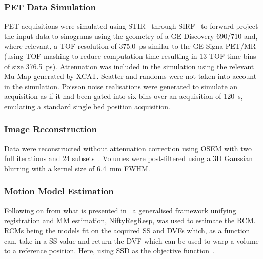             \subsubsection{PET Data Simulation} \label{sec:impact_of_tof_on_respiratory_motion_model_estimation_using_pre_gated_no_intra_cycle_motion_nac_pet_methods_pet_data_simulation}
                \gls{PET} acquisitions were simulated using \gls{STIR}~\parencite{Thielemans2012} through \gls{SIRF}~\parencite{Ovtchinnikov2017} to forward project the input data to sinograms using the geometry of a \gls{GE} Discovery 690/710 and, where relevant, a \gls{TOF} resolution of \SI{375.0}{\pico\second} similar to the \gls{GE} Signa \gls{PET}/\gls{MR} (using \gls{TOF} mashing to reduce computation time resulting in $13$ \gls{TOF} time bins of size \SI{376.5}{\pico\second}). Attenuation was included in the simulation using the relevant \gls{Mu-Map} generated by \gls{XCAT}. Scatter and randoms were not taken into account in the simulation. Poisson noise realisations were generated to simulate an acquisition as if it had been gated into six bins over an acquisition of \SI{120}{\second}, emulating a standard single bed position acquisition. 
            
            \subsubsection{Image Reconstruction} \label{sec:impact_of_tof_on_respiratory_motion_model_estimation_using_pre_gated_no_intra_cycle_motion_nac_pet_methods_image_reconstruction}
                Data were reconstructed without attenuation correction using \gls{OSEM} with two full iterations and $24$ subsets~\parencite{Hudson1994}. Volumes were post-filtered using a \gls{3D} Gaussian blurring with a kernel size of \SI{6.4}{\milli\metre} \gls{FWHM}.
            
            \subsubsection{Motion Model Estimation} \label{sec:impact_of_tof_on_respiratory_motion_model_estimation_using_pre_gated_no_intra_cycle_motion_nac_pet_methods_motion_model_estimation}
                Following on from what is presented in~ a generalised framework unifying registration and \gls{MM} estimation, NiftyRegResp, was used to estimate the \gls{RCM}. \glspl{RCM} being the models fit on the acquired \gls{SS} and \glspl{DVF} which, as a function can, take in a \gls{SS} value and return the \gls{DVF} which can be used to warp a volume to a reference position. Here, using \gls{SSD} as the objective function~\parencite{McClelland2017}.
                
